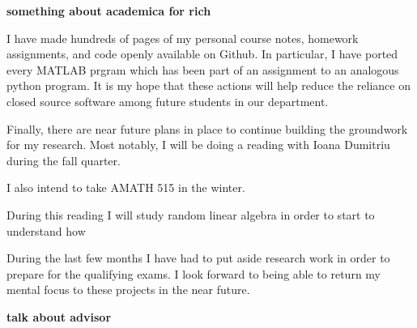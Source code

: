 \documentclass[11pt]{article}
\begin{document}
\textbf{something about academica for rich}

I have made hundreds of pages of my personal course notes, homework assignments, and code openly available on Github. In particular, I have ported every MATLAB prgram which has been part of an assignment to an analogous python program. It is my hope that these actions will help reduce the reliance on closed source software among future students in our department.


Finally, there are near future plans in place to continue building the groundwork for my research. Most notably, I will be doing a reading with Ioana Dumitriu during the fall quarter. 


I also intend to take AMATH 515 in the winter.

During this reading I will study random linear algebra in order to start to understand how 

During the last few months I have had to put aside research work in order to prepare for the qualifying exams. I look forward to being able to return my mental focus to these projects in the near future. 

\textbf{talk about advisor}





\end{document}
